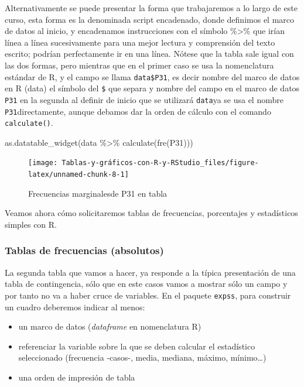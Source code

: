 \documentclass[
]{book}
\newenvironment{Shaded}{\begin{snugshade}}{\end{snugshade}}
\newcommand{\FunctionTok}[1]{\textcolor[rgb]{0.00,0.00,0.00}{#1}}
\newcommand{\NormalTok}[1]{#1}
\newcommand{\SpecialCharTok}[1]{\textcolor[rgb]{0.00,0.00,0.00}{#1}}
\providecommand{\tightlist}{%
  \setlength{\itemsep}{0pt}\setlength{\parskip}{0pt}}
\begin{document}
Alternativamente se puede presentar la forma que trabajaremos a lo largo de este curso, esta forma es la denominada script encadenado, donde definimos el marco de datos al inicio, y encadenamos instrucciones con el símbolo \%\textgreater\% que irían línea a línea sucesivamente para una mejor lectura y comprensión del texto escrito; podrían perfectamente ir en una línea. Nótese que la tabla sale igual con las dos formas, pero mientras que en el primer caso se usa la nomenclatura estándar de R, y el campo se llama \texttt{data\$P31}, es decir nombre del marco de datos en R (data) el símbolo del \texttt{\$} que separa y nombre del campo en el marco de datos \texttt{P31} en la segunda al definir de inicio que se utilizará \texttt{data}ya se usa el nombre \texttt{P31}directamente, aunque debamos dar la orden de cálculo con el comando \texttt{calculate()}.

\begin{Shaded}
\begin{Highlighting}[]
\FunctionTok{as.datatable\_widget}\NormalTok{(data }\SpecialCharTok{\%\textgreater{}\%} \FunctionTok{calculate}\NormalTok{(}\FunctionTok{fre}\NormalTok{(P31)))}
\end{Highlighting}
\end{Shaded}

\begin{figure}[H]

{\centering \texttt{[image: Tablas-y-gráficos-con-R-y-RStudio\_files/figure-latex/unnamed-chunk-8-1]} 

}

\caption{Frecuencias marginalesde P31 en tabla}\label{fig:unnamed-chunk-8}
\end{figure}

Veamos ahora cómo solicitaremos tablas de frecuencias, porcentajes y estadísticos simples con R.

\hypertarget{tablas-de-frecuencias-absolutos}{%
\subsubsection{Tablas de frecuencias (absolutos)}\label{tablas-de-frecuencias-absolutos}}

La segunda tabla que vamos a hacer, ya responde a la típica presentación de una tabla de contingencia, sólo que en este casos vamos a mostrar sólo un campo y por tanto no va a haber cruce de variables. En el paquete \texttt{expss}, para construir un cuadro deberemos indicar al menos:

\begin{itemize}
\tightlist
\item
  un marco de datos (\emph{dataframe} en nomenclatura R)
\item
  referenciar la variable sobre la que se deben calcular el estadístico seleccionado (frecuencia -casos-, media, mediana, máximo, mínimo\ldots)
\item
  una orden de impresión de tabla
\end{itemize}
\end{document}
